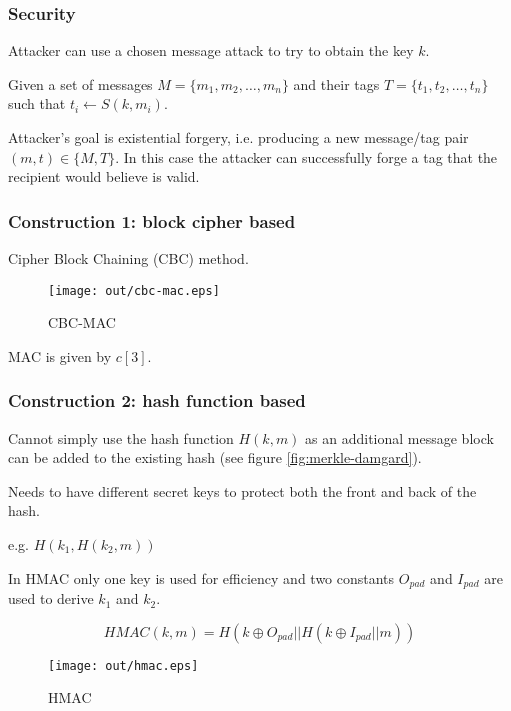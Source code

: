 \documentclass[a4paper]{article}
\begin{document}
\subsubsection{Security}

Attacker can use a chosen message attack to try to obtain the key $k$.

Given a set of messages $M = \{m_{1}, m_{2}, \ldots, m_{n}\}$ and their tags $T
= \{t_{1}, t_{2}, \ldots, t_{n}\}$ such that $t_{i} \leftarrow S(k, m_{i})$.

Attacker's goal is existential forgery, i.e. producing a new message/tag pair
$(m, t) \in \{M, T\}$. In this case the attacker can successfully forge a tag
that the recipient would believe is valid.

\subsubsection{Construction 1: block cipher based}

Cipher Block Chaining (CBC) method.

\begin{figure}[h!]
  \centering
  \texttt{[image: out/cbc-mac.eps]}
  \caption{CBC-MAC}
  \label{fig:cbc-mac}
\end{figure}
\FloatBarrier

MAC is given by $c[3]$.

\subsubsection{Construction 2: hash function based}

Cannot simply use the hash function $H(k, m)$ as an additional message block can
be added to the existing hash (see figure \ref{fig:merkle-damgard}).


Needs to have different secret keys to protect both the front and back of the
hash.

e.g. $H(k_{1}, H(k_{2}, m))$

In HMAC only one key is used for efficiency and two constants $O_{pad}$ and
$I_{pad}$ are used to derive $k_{1}$ and $k_{2}$.

\[
  HMAC(k, m) = H(k \oplus O_{pad} || H(k \oplus I_{pad} || m))
\]

\begin{figure}[h!]
  \centering
  \texttt{[image: out/hmac.eps]}
  \caption{HMAC}
  \label{fig:hmac}
\end{figure}
\FloatBarrier
\end{document}
